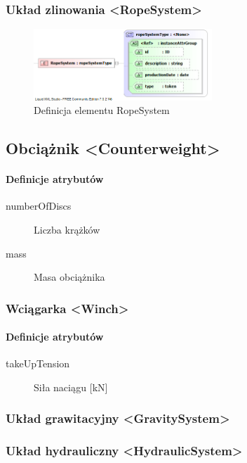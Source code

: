 \documentclass[12pt,a4paper]{article}
\begin{document}
\subsubsection{Układ zlinowania <RopeSystem>}

\begin{figure}[h]
  \centering
  \includegraphics[width=0.6\textwidth]{png/liquid/RopeSystem}
  \caption{Definicja elementu RopeSystem}
  \label{fig:ropeSystem-xsd}
\end{figure}


\subsection{Obciążnik <Counterweight>}

\paragraph{Definicje atrybutów}
\begin{description}
\item[numberOfDiscs] Liczba krążków
\item[mass] Masa obciążnika
\end{description}

\subsubsection{Wciągarka <Winch>}

\paragraph{Definicje atrybutów}
\begin{description}
\item[takeUpTension] Siła naciągu [kN]
\end{description}

\subsubsection{Układ grawitacyjny <GravitySystem>}


\subsubsection{Układ hydrauliczny <HydraulicSystem>}
\end{document}
